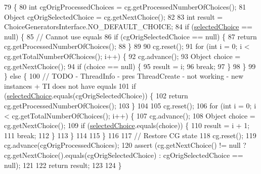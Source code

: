 \begin{DoxyCode}
79                                                         \{
80       \textcolor{keywordtype}{int} cgOrigProcessedChoices = cg.getProcessedNumberOfChoices();
81       Object cgOrigSelectedChoice = cg.getNextChoice();
82 
83       \textcolor{keywordtype}{int} result = ChoiceGeneratorsInterface.NO\_DEFAULT\_CHOICE;
84       \textcolor{keywordflow}{if} (\hyperlink{classgov_1_1nasa_1_1jpf_1_1inspector_1_1server_1_1breakpoints_1_1_default_forward_trace_manager_1_1_c_g_state_memento_ab02f1d7ec6e3c3ae21ce64e66f2d4001}{selectedChoice} == null) \{
85         \textcolor{comment}{// Cannot use equals}
86         \textcolor{keywordflow}{if} (cgOrigSelectedChoice == null) \{
87           \textcolor{keywordflow}{return} cg.getProcessedNumberOfChoices();
88         \}
89 
90         cg.reset();
91         \textcolor{keywordflow}{for} (\textcolor{keywordtype}{int} i = 0; i < cg.getTotalNumberOfChoices(); i++) \{
92           cg.advance();
93           Object choice = cg.getNextChoice();
94           \textcolor{keywordflow}{if} (choice == null) \{
95             result = i;
96             \textcolor{keywordflow}{break};
97           \}
98         \}
99       \} \textcolor{keywordflow}{else} \{
100         \textcolor{comment}{// TODO - ThreadInfo - pres ThreadCreate - not working - new instances + TI does not have equals}
101         \textcolor{keywordflow}{if} (\hyperlink{classgov_1_1nasa_1_1jpf_1_1inspector_1_1server_1_1breakpoints_1_1_default_forward_trace_manager_1_1_c_g_state_memento_ab02f1d7ec6e3c3ae21ce64e66f2d4001}{selectedChoice}.equals(cgOrigSelectedChoice)) \{
102           \textcolor{keywordflow}{return} cg.getProcessedNumberOfChoices();
103         \}
104 
105         cg.reset();
106         \textcolor{keywordflow}{for} (\textcolor{keywordtype}{int} i = 0; i < cg.getTotalNumberOfChoices(); i++) \{
107           cg.advance();
108           Object choice = cg.getNextChoice();
109           \textcolor{keywordflow}{if} (\hyperlink{classgov_1_1nasa_1_1jpf_1_1inspector_1_1server_1_1breakpoints_1_1_default_forward_trace_manager_1_1_c_g_state_memento_ab02f1d7ec6e3c3ae21ce64e66f2d4001}{selectedChoice}.equals(choice)) \{
110             result = i + 1;
111             \textcolor{keywordflow}{break};
112           \}
113         \}
114 
115       \}
116 
117       \textcolor{comment}{// Restore CG state}
118       cg.reset();
119       cg.advance(cgOrigProcessedChoices);
120       assert (cg.getNextChoice() != null ? cg.getNextChoice().equals(cgOrigSelectedChoice) : 
      cgOrigSelectedChoice == null);
121 
122       \textcolor{keywordflow}{return} result;
123 
124     \}
\end{DoxyCode}
